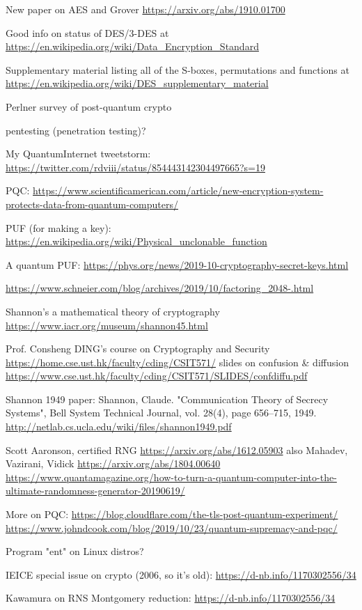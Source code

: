 \documentclass[%
 aip,
 jmp,%
 amsmath,amssymb,
 reprint,%
]{revtex4-1}
\begin{document}
New paper on AES and Grover
\url{https://arxiv.org/abs/1910.01700}

Good info on status of DES/3-DES at
\url{https://en.wikipedia.org/wiki/Data_Encryption_Standard}

Supplementary material listing all of the S-boxes, permutations and
functions at
\url{https://en.wikipedia.org/wiki/DES_supplementary_material}

Perlner survey of post-quantum crypto

pentesting (penetration testing)?

My QuantumInternet tweetstorm:
\url{https://twitter.com/rdviii/status/854443142304497665?s=19}

PQC:
\url{https://www.scientificamerican.com/article/new-encryption-system-protects-data-from-quantum-computers/}

PUF (for making a key):
\url{https://en.wikipedia.org/wiki/Physical_unclonable_function}

A quantum PUF:
\url{https://phys.org/news/2019-10-cryptography-secret-keys.html}

\url{https://www.schneier.com/blog/archives/2019/10/factoring_2048-.html}

Shannon's a mathematical theory of cryptography
\url{https://www.iacr.org/museum/shannon45.html}

Prof. Consheng DING's course on Cryptography and Security
\url{https://home.cse.ust.hk/faculty/cding/CSIT571/}
slides on confusion \& diffusion
\url{https://www.cse.ust.hk/faculty/cding/CSIT571/SLIDES/confdiffu.pdf}

Shannon 1949 paper:
Shannon, Claude. "Communication Theory of Secrecy Systems", Bell System Technical Journal, vol. 28(4), page 656–715, 1949.
\url{http://netlab.cs.ucla.edu/wiki/files/shannon1949.pdf}

Scott Aaronson, certified RNG
\url{https://arxiv.org/abs/1612.05903}
also Mahadev, Vazirani, Vidick
\url{https://arxiv.org/abs/1804.00640}
\url{https://www.quantamagazine.org/how-to-turn-a-quantum-computer-into-the-ultimate-randomness-generator-20190619/}


More on PQC:
\url{https://blog.cloudflare.com/the-tls-post-quantum-experiment/}
\url{https://www.johndcook.com/blog/2019/10/23/quantum-supremacy-and-pqc/}

Program "ent" on Linux distros?

IEICE special issue on crypto (2006, so it's old):
\url{https://d-nb.info/1170302556/34}

Kawamura on RNS Montgomery reduction:
\url{https://d-nb.info/1170302556/34}
\end{document}
